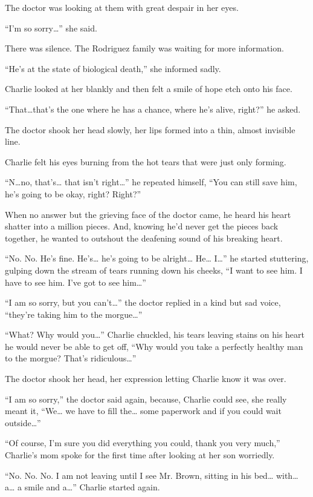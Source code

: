 The doctor was looking at them with great despair in her eyes.

“I'm so sorry…” she said.

There was silence. The Rodriguez family was waiting for more information.

“He's at the state of biological death,” she informed sadly.

Charlie looked at her blankly and then felt a smile of hope etch onto his face.

“That…that's the one where he has a chance, where he's alive, right?” he asked.

The doctor shook her head slowly, her lips formed into a thin, almost invisible line.

Charlie felt his eyes burning from the hot tears that were just only forming.

“N…no, that's… that isn't right…” he repeated himself, “You can still save him, he's going to be okay, right? Right?”

When no answer but the grieving face of the doctor came, he heard his heart shatter into a million pieces. And, knowing he'd never get the pieces back together, he wanted to outshout the deafening sound of his breaking heart.

“No. No. He's fine. He's… he's going to be alright… He… I…” he started stuttering, gulping down the stream of tears running down his cheeks, “I want to see him. I have to see him. I've got to see him…”

“I am so sorry, but you can't…” the doctor replied in a kind but sad voice, “they're taking him to the morgue…”

“What? Why would you…” Charlie chuckled, his tears leaving stains on his heart he would never be able to get off, “Why would you take a perfectly healthy man to the morgue? That's ridiculous…”

The doctor shook her head, her expression letting Charlie know it was over.

“I am so sorry,” the doctor said again, because, Charlie could see, she really meant it, “We… we have to fill the… some paperwork and if you could wait outside…”

“Of course, I'm sure you did everything you could, thank you very much,” Charlie's mom spoke for the first time after looking at her son worriedly.

“No. No. No. I am not leaving until I see Mr. Brown, sitting in his bed… with… a… a smile and a…” Charlie started again.

